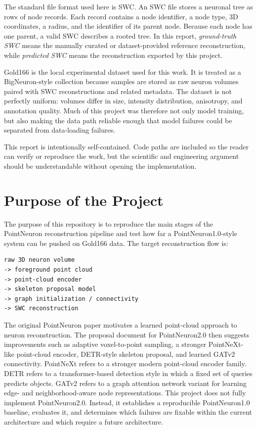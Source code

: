 \documentclass[11pt]{article}
\begin{document}
The standard file format used here is SWC. An SWC file stores a neuronal tree
as rows of node records. Each record contains a node identifier, a node type,
3D coordinates, a radius, and the identifier of its parent node. Because each
node has one parent, a valid SWC describes a rooted tree. In this report,
\emph{ground-truth SWC} means the manually curated or dataset-provided
reference reconstruction, while \emph{predicted SWC} means the reconstruction
exported by this project.

Gold166 is the local experimental dataset used for this work. It is treated as
a BigNeuron-style collection because samples are stored as raw neuron volumes
paired with SWC reconstructions and related metadata. The dataset is not
perfectly uniform: volumes differ in size, intensity distribution, anisotropy,
and annotation quality. Much of this project was therefore not only model
training, but also making the data path reliable enough that model failures
could be separated from data-loading failures.

This report is intentionally self-contained. Code paths are included so the
reader can verify or reproduce the work, but the scientific and engineering
argument should be understandable without opening the implementation.

\section{Purpose of the Project}

The purpose of this repository is to reproduce the main stages of the
PointNeuron reconstruction pipeline and test how far a PointNeuron1.0-style
system can be pushed on Gold166 data. The target reconstruction flow is:

\begin{lstlisting}
raw 3D neuron volume
-> foreground point cloud
-> point-cloud encoder
-> skeleton proposal model
-> graph initialization / connectivity
-> SWC reconstruction
\end{lstlisting}

The original PointNeuron paper motivates a learned point-cloud approach to
neuron reconstruction. The proposal document for PointNeuron2.0 then suggests
improvements such as adaptive voxel-to-point sampling, a stronger PointNeXt-like
point-cloud encoder, DETR-style skeleton proposal, and learned GATv2
connectivity. PointNeXt refers to a stronger modern point-cloud encoder family.
DETR refers to a transformer-based detection style in which a fixed set of
queries predicts objects. GATv2 refers to a graph attention network variant for
learning edge- and neighborhood-aware node representations. This project does
not fully implement PointNeuron2.0. Instead, it establishes a reproducible
PointNeuron1.0 baseline, evaluates it, and determines which failures are
fixable within the current architecture and which require a future architecture.
\end{document}

